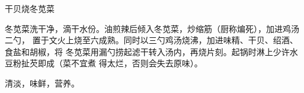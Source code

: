 %
%
%
%
%
%
%
\begin{recipe}{干贝烧冬苋菜}

\ingredients


\preparation

冬苋菜洗干净，滴干水份。油煎辣后倾入冬苋菜，炒缩筋（厨称煸死），加进鸡汤二勺，
置于文火上烧至六成熟。同时以三勺鸡汤烧沸，加进味精、干贝、绍酒、食盐和胡椒，将
冬苋菜用漏勺捞起滤干转入汤内，再烧片刻。起锅时淋上少许水豆粉扯芡即成（菜不宜煮
得太烂，否则会失去原味）。

\features

清淡，味鲜，营养。

\end{recipe}

